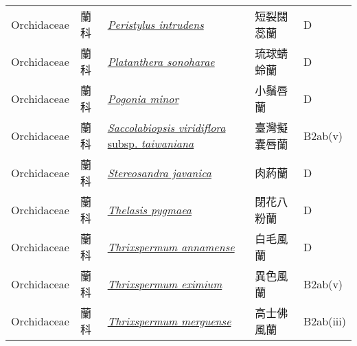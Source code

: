 {\begin{longtable}{L{2.5cm}L{2cm}L{5cm}L{2.5cm}L{3cm}}
    Orchidaceae & 蘭科 & \href{http://www.theplantlist.org/tpl1.1/search?q=Peristylus+intrudens}{\textit{Peristylus intrudens} } & 短裂闊蕊蘭 & D    \\
    Orchidaceae & 蘭科 & \href{http://www.theplantlist.org/tpl1.1/search?q=Platanthera+sonoharae}{\textit{Platanthera sonoharae} } & 琉球蜻蛉蘭 & D    \\
    Orchidaceae & 蘭科 & \href{http://www.theplantlist.org/tpl1.1/search?q=Pogonia+minor}{\textit{Pogonia minor} } & 小鬚唇蘭 & D    \\
    Orchidaceae & 蘭科 & \href{http://www.theplantlist.org/tpl1.1/search?q=Saccolabiopsis+viridiflora+subsp.+taiwaniana}{\textit{Saccolabiopsis viridiflora} subsp. \textit{taiwaniana} } & 臺灣擬囊唇蘭 & B2ab(v)    \\
    Orchidaceae & 蘭科 & \href{http://www.theplantlist.org/tpl1.1/search?q=Stereosandra+javanica}{\textit{Stereosandra javanica} } & 肉葯蘭 & D    \\
    Orchidaceae & 蘭科 & \href{http://www.theplantlist.org/tpl1.1/search?q=Thelasis+pygmaea}{\textit{Thelasis pygmaea} } & 閉花八粉蘭 & D    \\
    Orchidaceae & 蘭科 & \href{http://www.theplantlist.org/tpl1.1/search?q=Thrixspermum+annamense}{\textit{Thrixspermum annamense} } & 白毛風蘭 & D    \\
    Orchidaceae & 蘭科 & \href{http://www.theplantlist.org/tpl1.1/search?q=Thrixspermum+eximium}{\textit{Thrixspermum eximium} } & 異色風蘭 & B2ab(v)    \\
    Orchidaceae & 蘭科 & \href{http://www.theplantlist.org/tpl1.1/search?q=Thrixspermum+merguense}{\textit{Thrixspermum merguense} } & 高士佛風蘭 & B2ab(iii)    \\

\end{longtable}}
